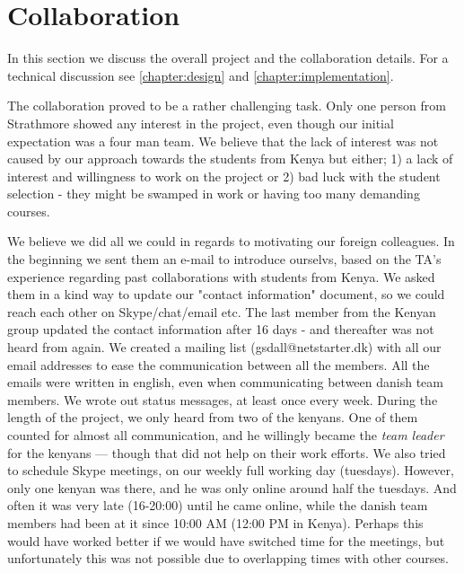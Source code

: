 \section{Collaboration}\label{sec:discussioncollaboration}
In this section we discuss the overall project and the collaboration details. For a technical discussion see \ref{chapter:design} and \ref{chapter:implementation}. 

The collaboration proved to be a rather challenging task. Only one person from Strathmore showed any interest in the project, even though our initial expectation was a four man team. We believe that the lack of interest was not caused by our approach towards the students from Kenya but either; 1) a lack of interest and willingness to work on the project or 2) bad luck with the student selection - they might be swamped in work or having too many demanding courses.

We believe we did all we could in regards to motivating our foreign colleagues. In the beginning we sent them an e-mail to introduce ourselvs, based on the TA's experience regarding past collaborations with students from Kenya. We asked them in a kind way to update our "contact information" document, so we could reach each other on Skype/chat/email etc. The last member from the Kenyan group updated the contact information after 16 days - and thereafter was not heard from again. We created a mailing list (gsdall@netstarter.dk) with all our email addresses to ease the communication between all the members. All the emails were written in english, even when communicating between danish team members. We wrote out status messages, at least once every week. During the length of the project, we only heard from two of the kenyans. One of them counted for almost all communication, and he willingly became the \textit{team leader} for the kenyans --- though that did not help on their work efforts. We also tried to schedule Skype meetings, on our weekly full working day (tuesdays). However, only one kenyan was there, and he was only online around half the tuesdays. And often it was very late (16-20:00) until he came online, while the danish team members had been at it since 10:00 AM (12:00 PM in Kenya). Perhaps this would have worked better if we would have switched time for the meetings, but unfortunately this was not possible due to overlapping times with other courses.

